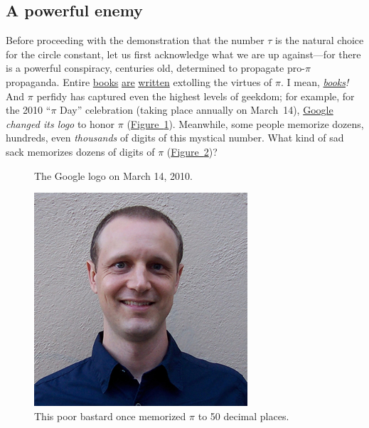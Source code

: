 \documentclass{article}
\begin{document}
 \subsection{A powerful enemy} %

Before proceeding with the demonstration that the number $\tau$ is the natural choice for the circle constant, let us first acknowledge what we are up against---for there is a powerful conspiracy, centuries old, determined to propagate pro-$\pi$ propaganda. Entire \href{http://www.amazon.com/exec/obidos/ISBN=0802713327/parallaxproductiA/}{books} \href{http://www.amazon.com/Pi-Sky-Counting-Thinking-Being/dp/0198539568}{are} \href{http://www.amazon.com/exec/obidos/ISBN=0312381859/parallaxproductiA/}{written} extolling the virtues of $\pi$. I mean, \href{http://www.amazon.com/exec/obidos/ISBN=0387989463/parallaxproductiA/}{\emph{books}}\emph{!} And $\pi$ perfidy has captured even the highest levels of geekdom; for example, for the 2010 ``$\pi$ Day'' celebration (taking place annually on March~14), \href{http://www.google.com/}{Google} \emph{changed its logo} to honor $\pi$  (\hyperref[fig:google-pi-day]{Figure~}\ref{fig:google-pi-day}).  Meanwhile, some people memorize dozens, hundreds, even \emph{thousands} of digits of this mystical number. What kind of sad sack memorizes dozens of digits of $\pi$ (\hyperref[fig:michael_hartl]{Figure~}\ref{fig:michael_hartl})?

\begin{figure}
\begin{center}
\end{center}
\caption{The Google logo on March 14, 2010.\label{fig:google-pi-day}}
\end{figure}

\begin{figure}
\begin{center}
\includegraphics{images/figures/michael_hartl.jpg}
\end{center}
\caption{This poor bastard once memorized $\pi$ to 50 decimal places.\label{fig:michael_hartl}}
\end{figure}
\end{document}
